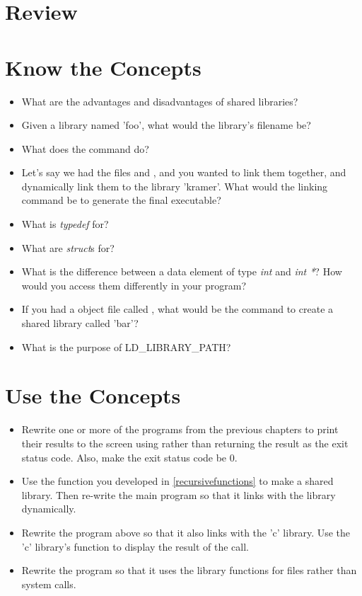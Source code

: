 \section{Review}

\section{Know the Concepts}

\begin{itemize}\item What are the advantages and disadvantages of shared libraries? 
\item Given a library named 'foo', what would the library's filename be? 
\item What does the  command do? 
\item Let's say we had the files  and , and you wanted to link them together, and dynamically link them to the library 'kramer'.  What would the linking command be to generate the final executable? 
\item What is \emph{typedef} for? 
\item What are \emph{struct}s for? 
\item What is the difference between a data element of type \emph{int} and \emph{int *}?  How would you access them differently in your program? 
\item If you had a object file called , what would be the command to create a shared library called 'bar'? 
\item What is the purpose of LD\_LIBRARY\_PATH? 
\end{itemize}

\section{Use the Concepts}

\begin{itemize}\item Rewrite one or more of the programs from the previous chapters to print their results to the screen using  rather than returning the result as the exit status code.  Also, make the exit status code be 0. 
\item Use the  function you developed in \autoref{recursivefunctions} to make a shared library.  Then re-write the main program so that it links with the library dynamically. 
\item Rewrite the program above so that it also links with the 'c' library.  Use the 'c' library's  function to display the result of the  call. 
\item Rewrite the  program so that it uses the  library functions for files rather than system calls. 
\end{itemize}

